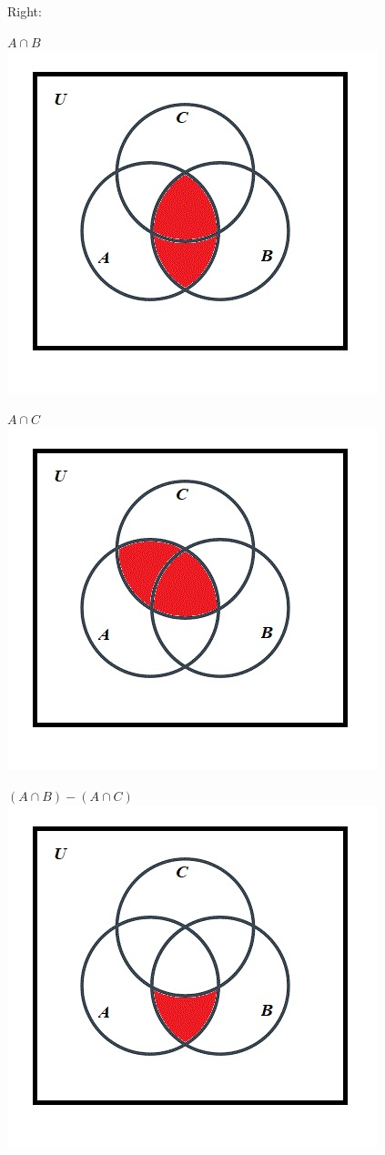 \documentclass[10pt]{article}
\begin{document}
Right:

$A \cap B$\\
\includegraphics[scale=0.55]{28}

$A \cap C$\\
\includegraphics[scale=0.55]{29}

$(A \cap B) - (A \cap C)$\\
\includegraphics[scale=0.55]{27}
\end{document}
